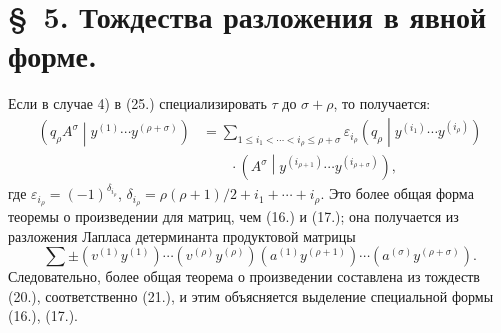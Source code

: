 \documentclass[11pt]{article}
\newcommand{\pair}[2]{\left(#1\middle|#2\right)}
\newcommand{\eps}{\varepsilon}
\begin{document}
\section*{\S\ 5. Тождества разложения в явной форме.}

Если в случае 4) в (25.) специализировать $\tau$ до $\sigma+\rho$, то получается:
\begin{equation}
\begin{aligned}
 \pair{q_\rho A^\sigma}{y^{(1)}\cdots y^{(\rho+\sigma)}}
 &=\sum_{1\le i_1<\cdots<i_\rho\le \rho+\sigma}
 \eps_{i_\rho}\pair{q_\rho}{y^{(i_1)}\cdots y^{(i_\rho)}}\\
 &\qquad\cdot
 \pair{A^\sigma}{y^{(i_{\rho+1})}\cdots y^{(i_{\rho+\sigma})}},
\end{aligned}
\tag{32}
\end{equation}
где $\eps_{i_\rho}=(-1)^{\delta_{i_\rho}}$, $\delta_{i_\rho}=\rho(\rho+1)/2+i_1+\cdots+i_\rho$. Это более общая форма теоремы о произведении для матриц, чем (16.) и (17.); она получается из разложения Лапласа детерминанта продуктовой матрицы
\[
 \sum\pm(v^{(1)}y^{(1)})\cdots(v^{(\rho)}y^{(\rho)})
 (a^{(1)}y^{(\rho+1)})\cdots(a^{(\sigma)}y^{(\rho+\sigma)}).
\]
Следовательно, более общая теорема о произведении составлена из тождеств (20.), соответственно (21.), и этим объясняется выделение специальной формы (16.), (17.).
\end{document}
